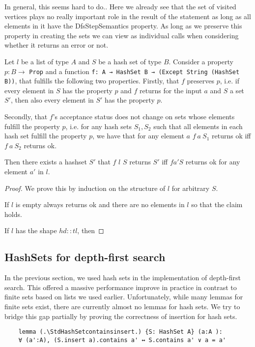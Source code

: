 In general, this seems hard to do..
Here we already see that the set of visited vertices plays no really important role in the result of the statement as long as all elements in it have the DfsStepSemantics property. As long as we preserve this property in creating the sets we can view \foldlexceptset as individual calls when considering whether it returns an error or not.

\begin{lemma}[\foldlexceptsetisok]
  Let $l$ be a list of type $A$ and $S$ be a hash set of type $B$. Consider a property $p: B \to$ \lstinline|Prop| and a function \lstinline|f: A → HashSet B → (Except String (HashSet B))|, that fulfills the following two properties.
  Firstly, that $f$ preserves $p$, i.e. if every element in $S$ has the property $p$ and $f$ returns for the input $a$ and $S$ a set $S'$, then also every element in $S'$ has the property $p$.

  Secondly, that $f$'s acceptance status does not change on sets whose elements fulfill the property $p$, i.e. for any hash sets $S_1, S_2$ such that all elements in each hash set fulfill the property $p$, we have that for any element $a$ $f\ a\ S_1$ returns ok iff $f\ a\ S_2$ returns ok.
  
  Then there exists a hashset $S'$ that \foldlexceptset $f$ $l$ $S$ returns $S'$ iff $f a' S$ returns ok for any element $a'$ in $l$.
\end{lemma}
\begin{proof}
  We prove this by induction on the structure of $l$ for arbitrary $S$.

  If $l$ is empty \foldlexceptset always returns ok and there are no elements in $l$ so that the claim holds.

  If $l$ has the shape $hd::tl$, then 
\end{proof}
\subsection{HashSets for depth-first search}

In the previous section, we used hash sets in the implementation of depth-first search. This offered a massive performance improve in practice in contrast to finite sets based on lists we used earlier. Unfortunately, while many lemmas for finite sets exist, there are currently almost no lemmas for hash sets. We try to bridge this gap partially by proving the correctness of insertion for hash sets.

\begin{lstlisting}
    lemma (.\StdHashSetcontainsinsert.) {S: HashSet A} (a:A ): 
    ∀ (a':A), (S.insert a).contains a' ↔ S.contains a' ∨ a = a' 

\end{lstlisting}